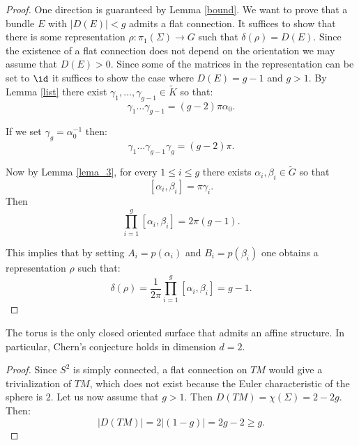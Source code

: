 \begin{proof}
	One direction is guaranteed by Lemma \ref{bound}. We want to prove that a bundle $E$ with $|D(E)|<g$ admits a flat connection. It suffices to show that
	there is some representation $\rho: \pi_1(\Sigma) \rightarrow G$ such that $\delta(\rho)=D(E)$. Since the existence of a flat connection does not depend on the orientation we may assume that $D(E)>0$. Since some of the matrices in the representation can be set to $\id$ it suffices to show the case where $D(E)=g-1$ and $g>1$.
	By Lemma \ref{list} there exist $\gamma_{1},...,\gamma_{g-1} \in \tilde{K}$ so that:
	\[\gamma_1 \dots \gamma_{g-1}=(g-2) \pi\alpha_{0}.\]
	
	If we set $\gamma_g=\alpha_{0}^{-1}$ then:
	\[\gamma_1 \dots \gamma_{g-1}\gamma_g=(g-2) \pi.\]
	
	Now by Lemma \ref{lema_3}, for every $1 \leqslant i \leqslant g$ there exists $\alpha_i,\beta_i \in \tilde{G}$ so that 
	\[[\alpha_i,\beta_i]= \pi \gamma_i.\]
	Then 
	\[\prod_{i=1}^g[\alpha_i,\beta_i]=2\pi (g-1).\]
	
	This implies that by setting $A_i=p(\alpha_i)$ and $B_i=p(\beta_i)$ one obtains a representation $\rho$ such that:
	\[\delta(\rho)=\frac{1}{2\pi}\prod_{i=1}^g[\alpha_i,\beta_i]= g-1.\]
\end{proof}


\begin{corollary}
	The torus is the only closed oriented surface that admits an affine structure. In particular, Chern's conjecture holds in dimension $d=2$.
\end{corollary}
\begin{proof}
	Since $S^2$ is simply connected, a flat connection on $TM$ would give a trivialization of $TM$, which does not exist because the Euler characteristic of the sphere is $2$.
	Let us now assume that $g>1$. Then $D(TM)=\chi(\Sigma)=2-2g$. Then:
	\[|D(TM)|= 2|(1-g)|=2g-2 \geq g.\]
\end{proof}
